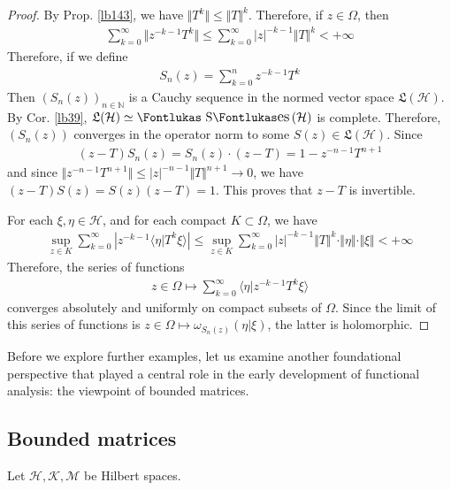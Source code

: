 \documentclass[12pt,b5paper,notitlepage]{article}
\theoremstyle{definition}
\theoremstyle{plain}
\DeclareMathOperator{\Ses}{\text{\Fontlukas S}\text{\kern -0pt {\Fontlukas\large es}}\,}
\newcommand{\fk}{\mathfrak}
\newcommand{\bk}[1]{\langle {#1}\rangle}
\newcommand{\Nbb}{\mathbb N}
\newcommand{\MH}{\mathcal H}
\newcommand{\MK}{\mathcal K}
\newcommand{\MM}{\mathcal M}
\numberwithin{equation}{section}
\begin{document}
\begin{proof}
By Prop. \ref{lb143}, we have $\Vert T^k\Vert\leq\Vert T\Vert^k$. Therefore, if $z\in\Omega$, then
\begin{align*}
\sum_{k=0}^\infty \Vert z^{-k-1}T^k\Vert\leq\sum_{k=0}^\infty |z|^{-k-1}\Vert T\Vert^k<+\infty
\end{align*}
Therefore, if we define
\begin{align}
S_n(z)=\sum_{k=0}^nz^{-k-1}T^k
\end{align}
Then $(S_n(z))_{n\in\Nbb}$ is a Cauchy sequence in the normed vector space $\fk L(\MH)$. By Cor. \ref{lb39}, $\fk L(\MH)\simeq\Ses(\MH)$ is complete. Therefore, $(S_n(z))$ converges in the operator norm to some $S(z)\in\fk L(\MH)$. Since
\begin{align*}
(z-T)S_n(z)=S_n(z)\cdot (z-T)=1-z^{-n-1}T^{n+1}
\end{align*}
and since $\Vert z^{-n-1}T^{n+1}\Vert\leq |z|^{-n-1}\Vert T\Vert^{n+1}\rightarrow0$, we have $(z-T)S(z)=S(z)(z-T)=1$. This proves that $z-T$ is invertible.

For each $\xi,\eta\in\MH$, and for each compact $K\subset \Omega$, we have
\begin{align*}
\sup_{z\in K}\sum_{k=0}^\infty |z^{-k-1}\bk{\eta|T^k\xi}|\leq \sup_{z\in K}\sum_{k=0}^\infty |z|^{-k-1}\Vert T\Vert^k\cdot\Vert\eta\Vert\cdot\Vert\xi\Vert<+\infty
\end{align*}
Therefore, the series of functions
\begin{align*}
z\in\Omega\mapsto \sum_{k=0}^\infty\bk{\eta|z^{-k-1}T^k\xi}
\end{align*}
converges absolutely and uniformly on compact subsets of $\Omega$. Since the limit of this series of functions is $z\in\Omega\mapsto\omega_{S_n(z)}(\eta|\xi)$, the latter is holomorphic.
\end{proof}



Before we explore further examples, let us examine another foundational perspective that played a central role in the early development of functional analysis: the viewpoint of bounded matrices.






\subsection{Bounded matrices}\label{lb154}


Let $\MH,\MK,\MM$ be Hilbert spaces.
\end{document}
